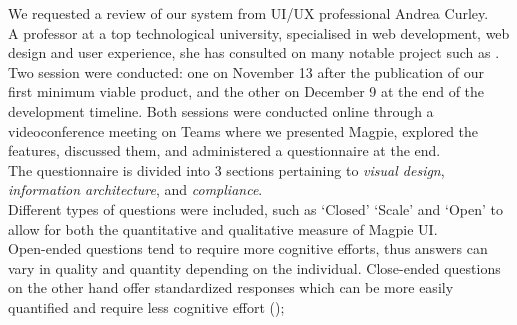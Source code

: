 \noindent We requested a review of our system from UI/UX professional Andrea Curley.\\
A professor at a top technological university, specialised in web development, web design and user experience, she has consulted on many notable project such as .\\
\noindent Two session were conducted: one on November 13 after the publication of our first minimum viable product, and the other on December 9 at the end of the development timeline. Both sessions were conducted online through a videoconference meeting on Teams where we presented Magpie, explored the features, discussed them, and administered a questionnaire at the end.\\
The questionnaire is divided into 3 sections pertaining to \emph{visual design}, \emph{information architecture}, and \emph{compliance}.\\
Different types of questions were included, such as `Closed' `Scale' and `Open' to allow for both the quantitative and qualitative measure of Magpie UI.\\
Open-ended questions tend to require more cognitive efforts, thus answers can vary in quality and quantity depending on the individual. Close-ended questions on the other hand offer standardized responses which can be more easily quantified and require less cognitive effort (\cite{mixsurveyquestions2020});

